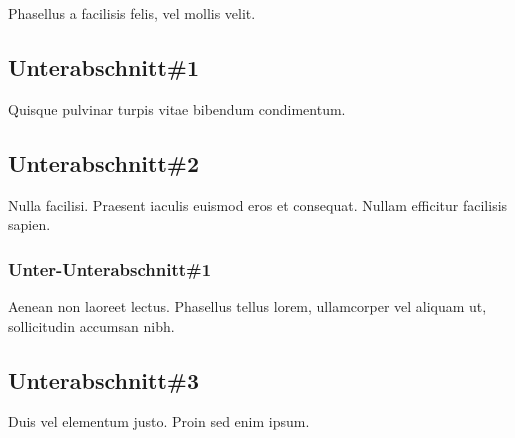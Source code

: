 Phasellus a facilisis felis, vel mollis velit. 

\subsection{Unterabschnitt\#1}

Quisque pulvinar turpis vitae bibendum condimentum. 

\subsection{Unterabschnitt\#2}

Nulla facilisi. Praesent iaculis euismod eros et consequat. Nullam efficitur facilisis sapien. 

\subsubsection{Unter-Unterabschnitt\#1}

Aenean non laoreet lectus. Phasellus tellus lorem, ullamcorper vel aliquam ut, sollicitudin accumsan nibh. 

\subsection{Unterabschnitt\#3}

Duis vel elementum justo. Proin sed enim ipsum. 
